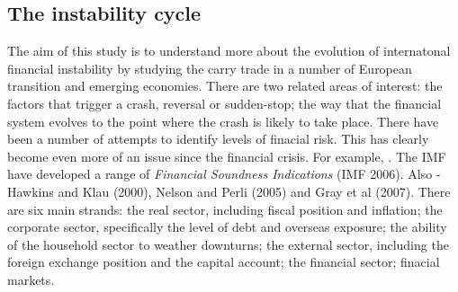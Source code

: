 \documentclass[12pt, a4paper, oneside]{article} %
\begin{document}

\subsection{The instability cycle}
The aim of this study is to understand more about the evolution of internatonal financial instability by studying the carry trade in a number of European transition and emerging economies. There are two related areas of interest:  the factors that trigger a crash, reversal or sudden-stop; the way that the financial system evolves to the point where the crash is likely to take place.  There have been a number of attempts to identify levels of finacial risk.  This has clearly become even more of an issue since the financial crisis.  For example, \citet{IFCMeasure}.  The IMF have developed a range of \emph{Financial Soundness Indications} (IMF 2006).     Also - Hawkins and Klau (2000), Nelson and Perli (2005) and Gray et al (2007).  There are six main strands:  the real sector, including fiscal position and inflation; the corporate sector, specifically the level of debt and overseas exposure; the ability of the household sector to weather downturns; the external sector, including the foreign exchange position and the capital account; the financial sector; finacial markets. 

\end{document}
